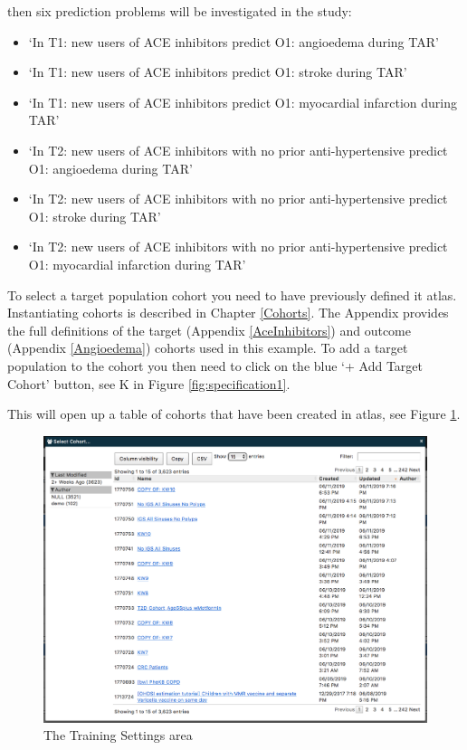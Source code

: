 \documentclass[11pt]{book}
\providecommand{\tightlist}{%
  \setlength{\itemsep}{0pt}\setlength{\parskip}{0pt}}
\theoremstyle{definition}
\theoremstyle{definition}
\theoremstyle{definition}
\theoremstyle{remark}
\begin{document}
then six prediction problems will be investigated in the study:

\begin{itemize}
\tightlist
\item
  `In T1: new users of ACE inhibitors predict O1: angioedema during TAR'
\item
  `In T1: new users of ACE inhibitors predict O1: stroke during TAR'
\item
  `In T1: new users of ACE inhibitors predict O1: myocardial infarction during TAR'
\item
  `In T2: new users of ACE inhibitors with no prior anti-hypertensive predict O1: angioedema during TAR'
\item
  `In T2: new users of ACE inhibitors with no prior anti-hypertensive predict O1: stroke during TAR'
\item
  `In T2: new users of ACE inhibitors with no prior anti-hypertensive predict O1: myocardial infarction during TAR'
\end{itemize}

To select a target population cohort you need to have previously defined it atlas. Instantiating cohorts is described in Chapter \ref{Cohorts}. The Appendix provides the full definitions of the target (Appendix \ref{AceInhibitors}) and outcome (Appendix \ref{Angioedema}) cohorts used in this example. To add a target population to the cohort you then need to click on the blue `+ Add Target Cohort' button, see K in Figure \ref{fig:specification1}.

This will open up a table of cohorts that have been created in atlas, see Figure \ref{fig:figure2k}.

\begin{figure}
\includegraphics[width=1\linewidth]{images/PatientLevelPrediction/atlasImplementation/target_pop_cohort_table} \caption{The Training Settings area}\label{fig:figure2k}
\end{figure}
\end{document}
